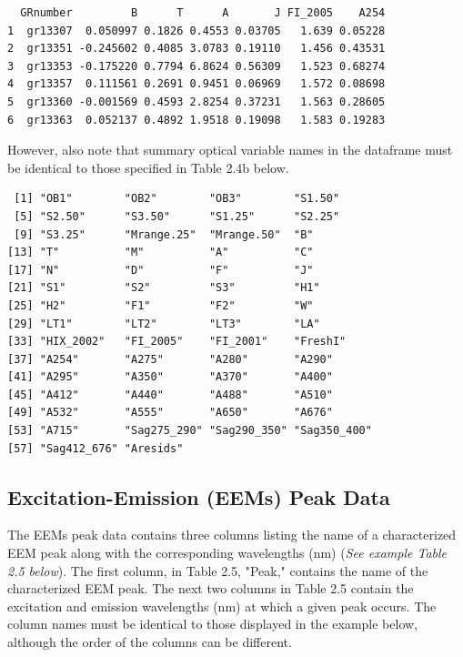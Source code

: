 \documentclass[a4paper,11pt]{article}\usepackage[]{graphicx}\usepackage[]{color}
\makeatletter
\newenvironment{kframe}{%
 \def\at@end@of@kframe{}%
 \ifinner\ifhmode%
  \def\at@end@of@kframe{\end{minipage}}%
  \begin{minipage}{\columnwidth}%
 \fi\fi%
 \def\FrameCommand##1{\hskip\@totalleftmargin \hskip-\fboxsep
 \colorbox{shadecolor}{##1}\hskip-\fboxsep
     \hskip-\linewidth \hskip-\@totalleftmargin \hskip\columnwidth}%
 \MakeFramed {\advance\hsize-\width
   \@totalleftmargin\z@ \linewidth\hsize
   \@setminipage}}%
 {\par\unskip\endMakeFramed%
 \at@end@of@kframe}
\newenvironment{knitrout}{}{} %
\makeatother
\begin{document}
\begin{knitrout}
\color{fgcolor}\begin{kframe}
\begin{verbatim}
  GRnumber         B      T      A       J FI_2005    A254
1  gr13307  0.050997 0.1826 0.4553 0.03705   1.639 0.05228
2  gr13351 -0.245602 0.4085 3.0783 0.19110   1.456 0.43531
3  gr13353 -0.175220 0.7794 6.8624 0.56309   1.523 0.68274
4  gr13357  0.111561 0.2691 0.9451 0.06969   1.572 0.08698
5  gr13360 -0.001569 0.4593 2.8254 0.37231   1.563 0.28605
6  gr13363  0.052137 0.4892 1.9518 0.19098   1.583 0.19283
\end{verbatim}
\end{kframe}
\end{knitrout}

However, also note that summary optical variable names in the dataframe must be identical to those specified in Table 2.4b below. 

\begin{knitrout}
\color{fgcolor}\begin{kframe}
\begin{verbatim}
 [1] "OB1"        "OB2"        "OB3"        "S1.50"     
 [5] "S2.50"      "S3.50"      "S1.25"      "S2.25"     
 [9] "S3.25"      "Mrange.25"  "Mrange.50"  "B"         
[13] "T"          "M"          "A"          "C"         
[17] "N"          "D"          "F"          "J"         
[21] "S1"         "S2"         "S3"         "H1"        
[25] "H2"         "F1"         "F2"         "W"         
[29] "LT1"        "LT2"        "LT3"        "LA"        
[33] "HIX_2002"   "FI_2005"    "FI_2001"    "FreshI"    
[37] "A254"       "A275"       "A280"       "A290"      
[41] "A295"       "A350"       "A370"       "A400"      
[45] "A412"       "A440"       "A488"       "A510"      
[49] "A532"       "A555"       "A650"       "A676"      
[53] "A715"       "Sag275_290" "Sag290_350" "Sag350_400"
[57] "Sag412_676" "Aresids"   
\end{verbatim}
\end{kframe}
\end{knitrout}

\subsection{Excitation-Emission (EEMs) Peak Data}
The EEMs peak data contains three columns listing the name of a characterized EEM peak along with the corresponding wavelengths (nm) (\emph{See example Table 2.5 below}). The first column, in Table 2.5, "Peak," contains the name of the characterized EEM peak. The next two columns in Table 2.5 contain the excitation and emission wavelengths (nm) at which a given peak occurs. The column names must be identical to those displayed in the example below, although the order of the columns can be different. 
\end{document}
